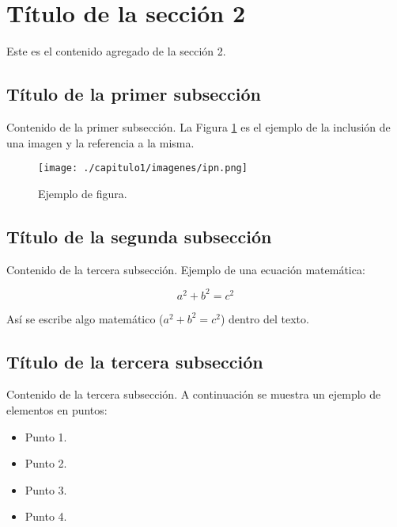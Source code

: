 \section{T\'itulo de la secci\'on 2}

    Este es el contenido agregado de la secci\'on 2.

    \subsection{T\'itulo de la primer subsecci\'on}

	   Contenido de la primer subsecci\'on. La Figura \ref{imagen} es el ejemplo de la inclusi\'on de una imagen y la referencia a la misma.

	   \begin{figure}[h] %
		  \begin{center}
			 \texttt{[image: ./capitulo1/imagenes/ipn.png]} %
		  \end{center}
	   \caption{Ejemplo de figura. \label{imagen}}
	   \end{figure}

    \subsection{T\'itulo de la segunda subsecci\'on}

	   Contenido de la tercera subsecci\'on. Ejemplo de una ecuaci\'on matem\'atica:

	   \begin{equation}
		  a^2 + b^2 = c^2
	   \end{equation} 

	   As\'i se escribe algo matem\'atico ($a^2 + b^2 = c^2$) dentro del texto.

    \subsection{T\'itulo de la tercera subsecci\'on}

	   Contenido de la tercera subsecci\'on. A continuaci\'on se muestra un ejemplo de elementos en puntos:

	   \begin{itemize}
		  \item Punto 1.
		  \item Punto 2.
		  \item Punto 3.
		  \item Punto 4.
	   \end{itemize}